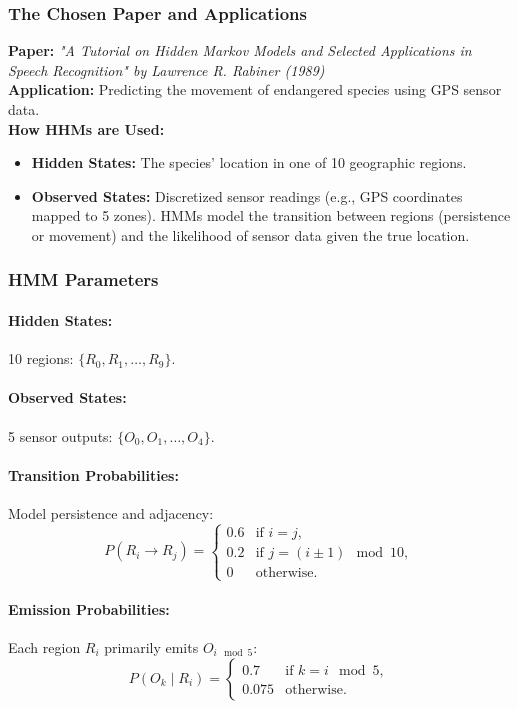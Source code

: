 \documentclass{article}
\begin{document}
\subsubsection*{The Chosen Paper and Applications}
\textbf{Paper:} \textit{"A Tutorial on Hidden Markov Models and Selected Applications in Speech Recognition" by Lawrence R. Rabiner (1989)}\\
\textbf{Application:} Predicting the movement of endangered species using GPS sensor data.\\
\textbf{How HHMs are Used:}
\begin{itemize}
    \item \textbf{Hidden States:} The species’ location in one of 10 geographic regions.
    \item \textbf{Observed States:} Discretized sensor readings (e.g., GPS coordinates mapped to 5 zones).
    HMMs model the transition between regions (persistence or movement) and the likelihood of sensor data given the true location.
\end{itemize}

\subsubsection*{HMM Parameters}

\paragraph{Hidden States:}
10 regions: \(\{R_0, R_1, \ldots, R_9\}\).

\paragraph{Observed States:}
5 sensor outputs: \(\{O_0, O_1, \ldots, O_4\}\).

\paragraph{Transition Probabilities:}
Model persistence and adjacency:
\[
P(R_i \to R_j) =
\begin{cases} 
0.6 & \text{if } i = j, \\
0.2 & \text{if } j = (i \pm 1) \mod 10, \\
0 & \text{otherwise}.
\end{cases}
\]

\paragraph{Emission Probabilities:}
Each region \(R_i\) primarily emits \(O_{i \mod 5}\):
\[
P(O_k \mid R_i) =
\begin{cases} 
0.7 & \text{if } k = i \mod 5, \\
0.075 & \text{otherwise}.
\end{cases}
\]
\end{document}

